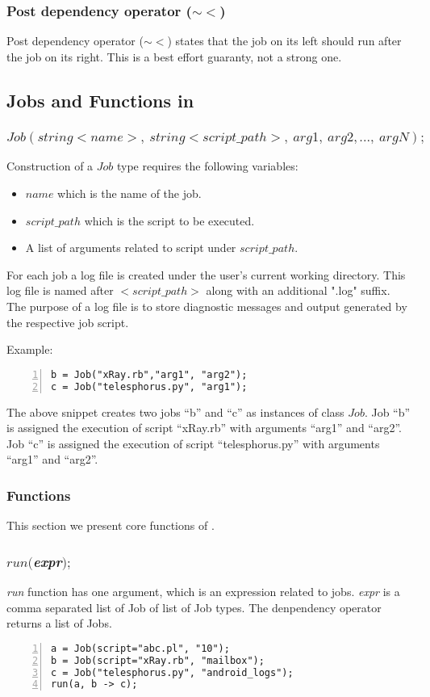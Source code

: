 \subsubsection*{Post dependency operator ($\sim<$)}
Post dependency operator ($\sim<$) states that the job on its left should run
after the job on its right. This is a best effort guaranty, not a strong one.

\subsection*{Jobs and Functions in \lang{}}
\subsubsection*{$Job(string <name>,~ string <script\_path>,~arg1,~arg2, ...,~argN);$}
Construction of a $Job$ type requires the following variables:
\begin{itemize}
\item $name$ which is the name of the job.
\item $script\_path$ which is the script to be executed.
\item A list of arguments related to script under $script\_path$.\\
\end{itemize}
For each \lang{} job a log file is created under the user's current working
directory. This
log file is named after $<script\_path>$ along with an additional ".log" suffix. The purpose
of a log file is to store diagnostic messages and output generated by the respective job script.

Example:
\begin{Verbatim}[numbers=left]
b = Job("xRay.rb","arg1", "arg2");
c = Job("telesphorus.py", "arg1");
\end{Verbatim}

The above snippet creates two jobs ``b'' and ``c'' as instances of class $Job$.
Job ``b'' is assigned the execution of script ``xRay.rb'' with arguments ``arg1'' and ``arg2''.
Job ``c'' is assigned the execution of script ``telesphorus.py'' with arguments ``arg1'' and ``arg2''.


\subsubsection*{\lang{} Functions}

This section we present core functions of \lang{}.
\subsubsection*{$run($\textit{expr}$);$}
\textit{run} function has one argument, which is an expression related to jobs.
\textit{expr} is a comma separated list of Job of list of Job types. The denpendency operator
returns a list of Jobs.
\begin{Verbatim}[numbers=left]
a = Job(script="abc.pl", "10");
b = Job(script="xRay.rb", "mailbox");
c = Job("telesphorus.py", "android_logs");
run(a, b -> c);
\end{Verbatim}

